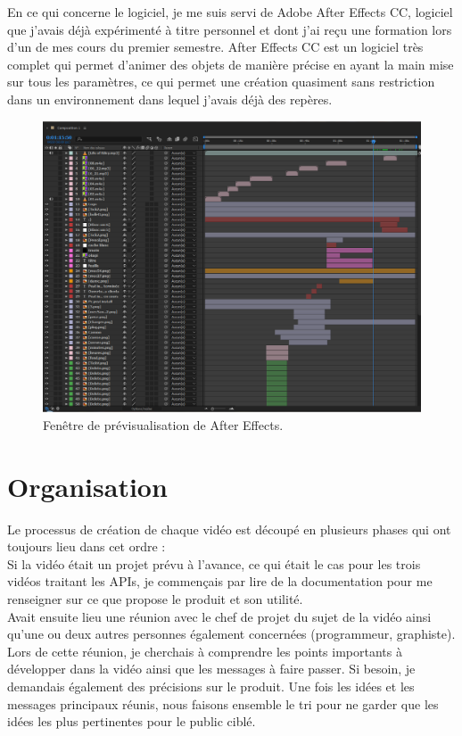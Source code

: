 En ce qui concerne le logiciel, je me suis servi de Adobe After Effects CC, logiciel que j'avais déjà expérimenté à titre personnel et dont j'ai reçu une formation lors d'un de mes cours du premier semestre. After Effects CC est un logiciel très complet qui permet d'animer des objets de manière précise en ayant la main mise sur tous les paramètres, ce qui permet une création quasiment sans restriction dans un environnement dans lequel j'avais déjà des repères.


\begin{figure}[htp]
  \centering
  \includegraphics[width=15cm]{images/comp1.png}
  \caption{Fenêtre de prévisualisation de After Effects.}
  \label{ae1}
\end{figure}




\section{Organisation}
Le processus de création de chaque vidéo est découpé en plusieurs phases qui ont toujours lieu dans cet ordre :\\

Si la vidéo était un projet prévu à l'avance, ce qui était le cas pour les trois vidéos traitant les APIs, je commençais par lire de la documentation pour me renseigner sur ce que propose le produit et son utilité.\\

Avait ensuite lieu une réunion avec le chef de projet du sujet de la vidéo ainsi qu'une ou deux autres personnes également concernées (programmeur, graphiste). Lors de cette réunion, je cherchais à comprendre les points importants à développer dans la vidéo ainsi que les messages à faire passer. Si besoin, je demandais également des précisions sur le produit. Une fois les idées et les messages principaux réunis, nous faisons ensemble le tri pour ne garder que les idées les plus pertinentes pour le public ciblé.\\





